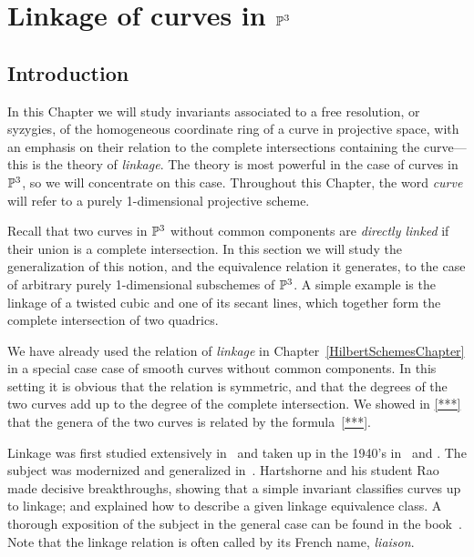 

\chapter{Linkage of curves in ${\mathbb P}^3$}
\label{DualityChapter}\label{LinkageChapter}

\def\length{{\rm length}}
\def\red{{\rm red}}
\section{Introduction} 
In this Chapter we will study  invariants associated to a free resolution, or syzygies, of the homogeneous coordinate ring of a curve in projective space, with an emphasis on their relation to the complete intersections containing the curve---this is the theory of \emph{linkage}. The theory is most powerful in the case of curves in ${\mathbb P}^3$, so we will concentrate on this case. Throughout this Chapter, the word \emph{curve} will refer to a purely 1-dimensional projective scheme.

Recall that two curves in ${\mathbb P}^3$ without common components are \emph{directly linked} if their union is a complete intersection. In this section we will study the generalization of this notion, and the equivalence relation it generates, to the case of arbitrary purely 1-dimensional subschemes of ${\mathbb P}^3$. A simple example is the linkage of a twisted cubic and one of its secant lines, which together form the complete intersection of two quadrics.

We have already used the relation of \emph{ linkage} in Chapter~\ref{HilbertSchemesChapter}  in a special case case of smooth curves without common components. In this setting it is obvious that the relation is symmetric, and that the degrees of the two curves add up to the degree of the complete intersection. We showed in \ref{***} that the genera of the two curves is related by the formula~\ref{***}. 

Linkage was first studied extensively in~\cite{Halphen} and taken up in the 1940's in~\cite{MR13558} and \cite{MR0052828}. The subject was modernized and generalized in~\cite{MR0364271}. Hartshorne%
and his student
Rao~\cite{MR520926} made decisive breakthroughs, showing that a simple invariant classifies curves up to linkage; and \cite{MR714753} explained how to describe a given linkage equivalence class. A thorough exposition of the subject in the general case can be found in the book~\cite{MR1712469}. Note that the linkage relation is often called by its French name, \emph{liaison}.


